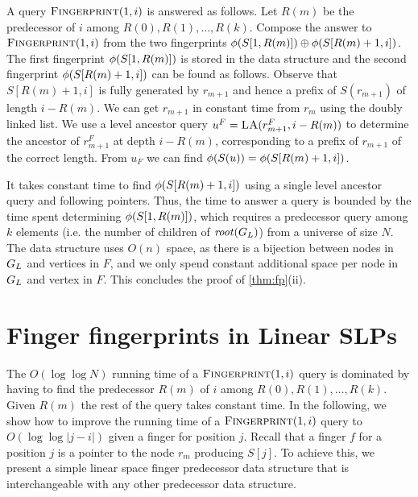 A query $\textsc{Fingerprint}(1, i)$ is answered as follows. Let $R(m)$ be the predecessor of $i$ among $R(0), R(1), \ldots, R(k)$. Compose the answer to $\textsc{Fingerprint}(1, i)$ from the two fingerprints $\phi(S[1, R(m)])\oplus\phi(S[R(m)+1, i])$. The first fingerprint $\phi(S[1, R(m)])$ is stored in the data structure and the second fingerprint $\phi(S[R(m)+1, i])$ can be found as follows. Observe that $S[R(m)+1, i]$ is fully generated by $r_{m+1}$ and hence a prefix of $S(r_{m+1})$ of length $i-R(m)$. We can get $r_{m+1}$ in constant time from $r_m$ using the doubly linked list. We use a level ancestor query $u^F = \textsc{LA}(r_{m+1}^F, i-R(m))$ to determine the ancestor of $r_{m+1}^F$ at depth $i-R(m)$, corresponding to a prefix of $r_{m+1}$ of the correct length. From $u_F$ we can find $\phi(S(u)) = \phi(S[R(m)+1, i])$.

It takes constant time to find $\phi(S[R(m)+1, i])$ using a single level ancestor query and following pointers. Thus, the time to answer a query is bounded by the time spent determining $\phi(S[1, R(m)])$, which requires a predecessor query among $k$ elements (i.e. the number of children of $\mathit{root}(G_L)$) from a universe of size $N$. The data structure uses $O(n)$ space, as there is a bijection between nodes in $G_L$ and vertices in $F$, and we only spend constant additional space per node in $G_L$ and vertex in $F$. This concludes the proof of \autoref{thm:fp}(ii).


\section{Finger fingerprints in Linear SLPs}
The $O(\log\log N)$ running time of a $\textsc{Fingerprint}(1, i)$ query is dominated by having to find the predecessor $R(m)$ of $i$ among $R(0), R(1), \ldots, R(k)$. Given $R(m)$ the rest of the query takes constant time. In the following, we show how to improve the running time of a $\textsc{Fingerprint}(1, i)$ query to $O(\log \log |j-i|)$ given a finger for position $j$.  %
Recall that a finger $f$ for  a position $j$ is a pointer to the node $r_m$ producing $S[j]$.
To achieve this, we present a simple linear space finger predecessor data structure that is interchangeable with any other predecessor data structure.


